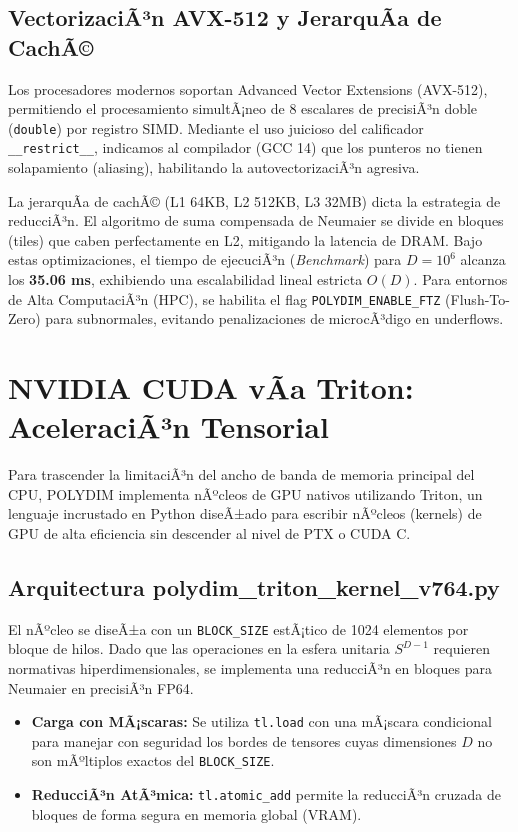 \subsection{VectorizaciÃ³n AVX-512 y JerarquÃ­a de CachÃ©}
Los procesadores modernos soportan Advanced Vector Extensions (AVX-512), permitiendo el procesamiento simultÃ¡neo de 8 escalares de precisiÃ³n doble (\texttt{double}) por registro SIMD. Mediante el uso juicioso del calificador \texttt{\_\_restrict\_\_}, indicamos al compilador (GCC 14) que los punteros no tienen solapamiento (aliasing), habilitando la autovectorizaciÃ³n agresiva.

La jerarquÃ­a de cachÃ© (L1 64KB, L2 512KB, L3 32MB) dicta la estrategia de reducciÃ³n. El algoritmo de suma compensada de Neumaier se divide en bloques (tiles) que caben perfectamente en L2, mitigando la latencia de DRAM. 
Bajo estas optimizaciones, el tiempo de ejecuciÃ³n (\textit{Benchmark}) para \(D=10^6\) alcanza los \textbf{35.06 ms}, exhibiendo una escalabilidad lineal estricta \(O(D)\). Para entornos de Alta ComputaciÃ³n (HPC), se habilita el flag \texttt{POLYDIM\_ENABLE\_FTZ} (Flush-To-Zero) para subnormales, evitando penalizaciones de microcÃ³digo en underflows.

\section{NVIDIA CUDA vÃ­a Triton: AceleraciÃ³n Tensorial}
\label{sec:nvidia_cuda_triton}

Para trascender la limitaciÃ³n del ancho de banda de memoria principal del CPU, POLYDIM implementa nÃºcleos de GPU nativos utilizando Triton, un lenguaje incrustado en Python diseÃ±ado para escribir nÃºcleos (kernels) de GPU de alta eficiencia sin descender al nivel de PTX o CUDA C.

\subsection{Arquitectura polydim\_triton\_kernel\_v764.py}
El nÃºcleo se diseÃ±a con un \texttt{BLOCK\_SIZE} estÃ¡tico de 1024 elementos por bloque de hilos. Dado que las operaciones en la esfera unitaria \(S^{D-1}\) requieren normativas hiperdimensionales, se implementa una reducciÃ³n en bloques para Neumaier en precisiÃ³n FP64. 

\begin{itemize}
    \item \textbf{Carga con MÃ¡scaras:} Se utiliza \texttt{tl.load} con una mÃ¡scara condicional para manejar con seguridad los bordes de tensores cuyas dimensiones \(D\) no son mÃºltiplos exactos del \texttt{BLOCK\_SIZE}.
    \item \textbf{ReducciÃ³n AtÃ³mica:} \texttt{tl.atomic\_add} permite la reducciÃ³n cruzada de bloques de forma segura en memoria global (VRAM).
\end{itemize}

